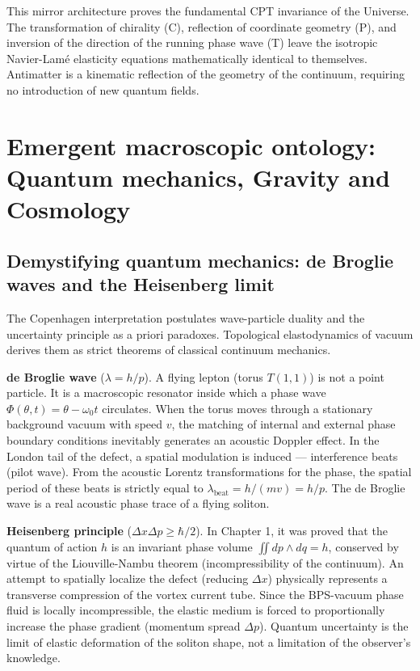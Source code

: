 \documentclass[11pt,a4paper]{article}
\begin{document}
This mirror architecture proves the fundamental CPT invariance of the Universe. The transformation of chirality (C), reflection of coordinate geometry (P), and inversion of the direction of the running phase wave (T) leave the isotropic Navier-Lamé elasticity equations mathematically identical to themselves. Antimatter is a kinematic reflection of the geometry of the continuum, requiring no introduction of new quantum fields.

\section{Emergent macroscopic ontology: Quantum mechanics, Gravity and Cosmology}

\subsection{Demystifying quantum mechanics: de Broglie waves and the Heisenberg limit}
The Copenhagen interpretation postulates wave-particle duality and the uncertainty principle as a priori paradoxes. Topological elastodynamics of vacuum derives them as strict theorems of classical continuum mechanics.

\textbf{de Broglie wave} ($\lambda = h/p$). A flying lepton (torus $T(1,1)$) is not a point particle. It is a macroscopic resonator inside which a phase wave $\Phi(\theta, t) = \theta - \omega_0 t$ circulates. When the torus moves through a stationary background vacuum with speed $v$, the matching of internal and external phase boundary conditions inevitably generates an acoustic Doppler effect. In the London tail of the defect, a spatial modulation is induced — interference beats (pilot wave). From the acoustic Lorentz transformations for the phase, the spatial period of these beats is strictly equal to $\lambda_{\text{beat}} = h / (mv) = h/p$. The de Broglie wave is a real acoustic phase trace of a flying soliton.

\textbf{Heisenberg principle} ($\Delta x \Delta p \ge \hbar/2$). In Chapter 1, it was proved that the quantum of action $h$ is an invariant phase volume $\iint dp \wedge dq = h$, conserved by virtue of the Liouville-Nambu theorem (incompressibility of the continuum). An attempt to spatially localize the defect (reducing $\Delta x$) physically represents a transverse compression of the vortex current tube. Since the BPS-vacuum phase fluid is locally incompressible, the elastic medium is forced to proportionally increase the phase gradient (momentum spread $\Delta p$). Quantum uncertainty is the limit of elastic deformation of the soliton shape, not a limitation of the observer's knowledge.
\end{document}
